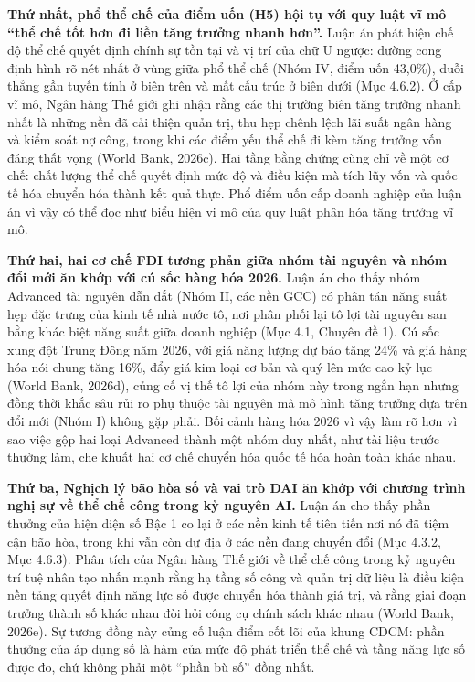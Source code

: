 \documentclass[
  a4paper,
  13pt]{extreport}
\begin{document}
\textbf{Thứ nhất, phổ thể chế của điểm uốn (H5) hội tụ với quy luật vĩ
mô ``thể chế tốt hơn đi liền tăng trưởng nhanh hơn''.} Luận án phát hiện
chế độ thể chế quyết định chính sự tồn tại và vị trí của chữ U ngược:
đường cong định hình rõ nét nhất ở vùng giữa phổ thể chế (Nhóm IV, điểm
uốn 43,0\%), duỗi thẳng gần tuyến tính ở biên trên và mất cấu trúc ở
biên dưới (Mục 4.6.2). Ở cấp vĩ mô, Ngân hàng Thế giới ghi nhận rằng các
thị trường biên tăng trưởng nhanh nhất là những nền đã cải thiện quản
trị, thu hẹp chênh lệch lãi suất ngân hàng và kiểm soát nợ công, trong
khi các điểm yếu thể chế đi kèm tăng trưởng vốn đáng thất vọng (World
Bank, 2026c). Hai tầng bằng chứng cùng chỉ về một cơ chế: chất lượng thể
chế quyết định mức độ và điều kiện mà tích lũy vốn và quốc tế hóa chuyển
hóa thành kết quả thực. Phổ điểm uốn cấp doanh nghiệp của luận án vì vậy
có thể đọc như biểu hiện vi mô của quy luật phân hóa tăng trưởng vĩ mô.

\textbf{Thứ hai, hai cơ chế FDI tương phản giữa nhóm tài nguyên và nhóm
đổi mới ăn khớp với cú sốc hàng hóa 2026.} Luận án cho thấy nhóm
Advanced tài nguyên dẫn dắt (Nhóm II, các nền GCC) có phân tán năng suất
hẹp đặc trưng của kinh tế nhà nước tô, nơi phân phối lại tô lợi tài
nguyên san bằng khác biệt năng suất giữa doanh nghiệp (Mục 4.1, Chuyên
đề 1). Cú sốc xung đột Trung Đông năm 2026, với giá năng lượng dự báo
tăng 24\% và giá hàng hóa nói chung tăng 16\%, đẩy giá kim loại cơ bản
và quý lên mức cao kỷ lục (World Bank, 2026d), củng cố vị thế tô lợi của
nhóm này trong ngắn hạn nhưng đồng thời khắc sâu rủi ro phụ thuộc tài
nguyên mà mô hình tăng trưởng dựa trên đổi mới (Nhóm I) không gặp phải.
Bối cảnh hàng hóa 2026 vì vậy làm rõ hơn vì sao việc gộp hai loại
Advanced thành một nhóm duy nhất, như tài liệu trước thường làm, che
khuất hai cơ chế chuyển hóa quốc tế hóa hoàn toàn khác nhau.

\textbf{Thứ ba, Nghịch lý bão hòa số và vai trò DAI ăn khớp với chương
trình nghị sự về thể chế công trong kỷ nguyên AI.} Luận án cho thấy phần
thưởng của hiện diện số Bậc 1 co lại ở các nền kinh tế tiên tiến nơi nó
đã tiệm cận bão hòa, trong khi vẫn còn dư địa ở các nền đang chuyển đổi
(Mục 4.3.2, Mục 4.6.3). Phân tích của Ngân hàng Thế giới về thể chế công
trong kỷ nguyên trí tuệ nhân tạo nhấn mạnh rằng hạ tầng số công và quản
trị dữ liệu là điều kiện nền tảng quyết định năng lực số được chuyển hóa
thành giá trị, và rằng giai đoạn trưởng thành số khác nhau đòi hỏi công
cụ chính sách khác nhau (World Bank, 2026e). Sự tương đồng này củng cố
luận điểm cốt lõi của khung CDCM: phần thưởng của áp dụng số là hàm của
mức độ phát triển thể chế và tầng năng lực số được đo, chứ không phải
một ``phần bù số'' đồng nhất.
\end{document}
